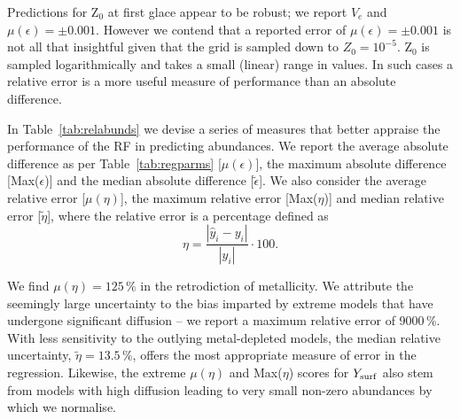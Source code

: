 Predictions for Z$_0$ at first glace appear to be robust; we report $V_e$ and  $\mu (\epsilon) = \pm 0.001$. However we contend that a reported error of  $\mu (\epsilon) = \pm 0.001$ is not all that insightful given that the grid is sampled down to $Z_0 = 10^{-5}$. Z$_0$ is sampled logarithmically and takes a small (linear) range in values. In such cases   a relative error is a more useful measure of performance than an absolute difference. 


In Table~\ref{tab:relabunds} we devise a series of measures that better appraise the performance of the RF in predicting abundances. We report the average absolute difference as per Table~\ref{tab:regparms} [$\mu (\epsilon)$], the maximum absolute difference [Max($\epsilon$)] and the median absolute difference [$\tilde{\epsilon}$]. We also consider the average relative error [$\mu (\eta)$], the maximum relative error [Max($\eta$)] and median relative error [$\tilde{\eta}$], where the relative error is a percentage defined as
\begin{equation}
  \eta= \frac{| \hat y_i - y_i |}{|y_i|} \cdot 100.
\end{equation}

We find  $\mu (\eta) =125\,\%$ in the retrodiction of metallicity. We attribute the seemingly large uncertainty to the bias imparted by extreme models that have undergone significant diffusion -- we report a maximum relative error of 9000\,\%. With less sensitivity to the outlying metal-depleted models, the median relative uncertainty, $\tilde{\eta} = 13.5\,\% $, offers the most appropriate measure of error in the regression. 
Likewise, the extreme $\mu (\eta)$ and Max($\eta$) scores for $Y_{\rm{surf}}$ also stem from models with high diffusion leading to very small non-zero abundances by which we normalise. 

